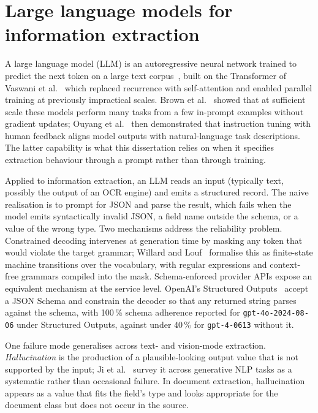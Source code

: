 \section{Large language models for information extraction}
\label{sec:bg-llms}

A large language model (LLM) is an autoregressive neural network
trained to predict the next token on a large text
corpus~\cite{zhao2023llm}, built on the Transformer of Vaswani et
al.~\cite{vaswani2017attention} which replaced recurrence with
self-attention and enabled parallel training at previously
impractical scales. Brown et al.~\cite{brown2020gpt3} showed that at
sufficient scale these models perform many tasks from a few in-prompt
examples without gradient updates; Ouyang et
al.~\cite{ouyang2022instructgpt} then demonstrated that instruction
tuning with human feedback aligns model outputs with natural-language
task descriptions. The latter capability is what this dissertation
relies on when it specifies extraction behaviour through a prompt
rather than through training.

Applied to information extraction, an LLM reads an input (typically
text, possibly the output of an OCR engine) and emits a structured
record. The naive realisation is to prompt for JSON and parse the
result, which fails when the model emits syntactically invalid JSON,
a field name outside the schema, or a value of the wrong type. Two
mechanisms address the reliability problem. Constrained decoding
intervenes at generation time by masking any token that would violate
the target grammar; Willard and Louf~\cite{willard2023guided}
formalise this as finite-state machine transitions over the
vocabulary, with regular expressions and context-free grammars
compiled into the mask. Schema-enforced provider APIs expose an
equivalent mechanism at the service level. OpenAI's Structured
Outputs~\cite{openai2024structured} accept a JSON Schema and constrain
the decoder so that any returned string parses against the schema,
with 100\,\% schema adherence reported for
\texttt{gpt-4o-2024-08-06} under Structured Outputs, against under
40\,\% for \texttt{gpt-4-0613} without it.

One failure mode generalises across text- and vision-mode extraction.
\emph{Hallucination} is the production of a plausible-looking output
value that is not supported by the input; Ji et
al.~\cite{ji2023hallucination} survey it across generative NLP tasks
as a systematic rather than occasional failure. In document
extraction, hallucination appears as a value that fits the field's
type and looks appropriate for the document class but does not occur
in the source.


